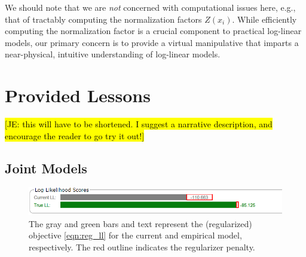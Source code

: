 \documentclass[11pt,letterpaper]{article}
\newcommand{\Note}[1]{}
\renewcommand{\Note}[1]{\hl{[#1]}}
\newcommand{\NoteSigned}[3]{{\sethlcolor{#2}\Note{#1: #3}}}
\newcommand{\NoteJE}[1]{\NoteSigned{JE}{LightGreen}{#1}}
\begin{document}
We should note that we are \textit{not} concerned with computational issues here, e.g., that of tractably computing the normalization factors $Z(x_i)$. While efficiently computing the normalization factor is a crucial component to practical log-linear models, our primary concern is to provide a virtual manipulative that imparts a near-physical, intuitive understanding of log-linear models. 


\section{Provided Lessons}\label{sec:lessons}

\NoteJE{this will have to be shortened.  I suggest a narrative
  description, and encourage the reader to go try it out!}




\subsection{Joint Models} \label{sec:jointlessons}
\begin{figure}[t]
\centering
\includegraphics[scale=.3]{images/regularized_ll_bar_andtrue_cut.PNG}

\caption{The gray and green bars and text represent the (regularized) objective
 \eqref{eqn:reg_ll} for the current and empirical model, respectively. The red 
outline indicates the regularizer penalty.}
\label{fig:llbar}
\end{figure}
\end{document}
